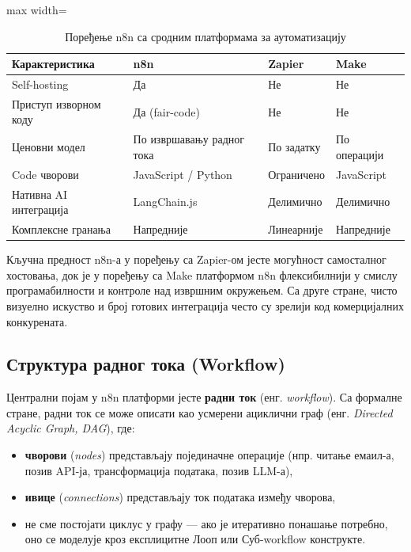 \begin{table}[h!]
\centering
\caption{Поређење n8n са сродним платформама за аутоматизацију}
\vspace{0.3cm}
\begin{adjustbox}{max width=\textwidth}
\begin{tabular}{|p{3.2cm}|p{2.7cm}|p{2.7cm}|p{2.7cm}|}
\hline
\textbf{Карактеристика} & \textbf{n8n} & \textbf{Zapier} & \textbf{Make} \\
\hline
Self-hosting & Да & Не & Не \\
\hline
Приступ изворном коду & Да (fair-code) & Не & Не \\
\hline
Ценовни модел & По извршавању радног тока & По задатку & По операцији \\
\hline
Code чворови & JavaScript / Python & Ограничено & JavaScript \\
\hline
Нативна AI интеграција & LangChain.js & Делимично & Делимично \\
\hline
Комплексне гранања & Напредније & Линеарније & Напредније \\
\hline
\end{tabular}
\end{adjustbox}
\label{tab:04-3}
\end{table}

Кључна предност n8n-а у поређењу са Zapier-ом јесте могућност
самосталног хостовања, док је у поређењу са Make платформом
n8n флексибилнији у смислу програмабилности и контроле над
извршним окружењем. Са друге стране, чисто визуелно искуство и
број готових интеграција често су зрелији код комерцијалних
конкурената.

\subsection{Структура радног тока (Workflow)}

Централни појам у n8n платформи јесте \textbf{радни ток}
(енг. \textit{workflow}). Са формалне стране, радни ток се може
описати као усмерени ациклични граф (енг. \textit{Directed Acyclic
Graph, DAG}), где:

\begin{itemize}
    \item \textbf{чворови} (\textit{nodes}) представљају појединачне
    операције (нпр. читање емаил-а, позив API-ја, трансформација
    података, позив LLM-а),
    \item \textbf{ивице} (\textit{connections}) представљају ток
    података између чворова,
    \item не сме постојати циклус у графу — ако је итеративно
    понашање потребно, оно се моделује кроз експлицитне Лооп или
    Суб-workflow конструкте.
\end{itemize}

